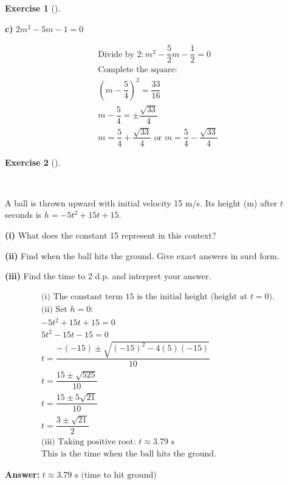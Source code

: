 \documentclass[
  letterpaper,
  DIV=11,
  numbers=noendperiod]{scrreprt}
\theoremstyle{definition}
\newtheorem{exercise}{Exercise}[chapter]
\theoremstyle{remark}
\begin{document}
\begin{exercise}[]
\begin{tcolorbox}
\textbf{c)} \(\displaystyle 2m^2 - 5m - 1 = 0\)

\begin{align*}
\text{Divide by } 2: m^2 -\dfrac{5}{2}m -\dfrac{1}{2} = 0 \\ \text{Complete the square:} \\ \left(m - \dfrac{5}{4}\right)^2 = \dfrac{33}{16} \\ m - \dfrac{5}{4} = \pm \dfrac{\sqrt{33}}{4} \\ m = \dfrac{5}{4} + \dfrac{\sqrt{33}}{4} \text{ or } m = \dfrac{5}{4} - \dfrac{\sqrt{33}}{4}
\end{align*}

\end{tcolorbox}

\end{exercise}

\begin{exercise}[]\protect\hypertarget{exr-u6-20-1}{}\label{exr-u6-20-1}

~

A ball is thrown upward with initial velocity 15 m/s. Its height (m)
after \(t\) seconds is \(h = -5t^2 + 15t + 15\).

\textbf{(i)} What does the constant 15 represent in this context?

\textbf{(ii)} Find when the ball hits the ground. Give exact answers in
surd form.

\textbf{(iii)} Find the time to 2 d.p. and interpret your answer.

\begin{tcolorbox}[enhanced jigsaw, opacitybacktitle=0.6, coltitle=black, arc=.35mm, colframe=quarto-callout-tip-color-frame, colback=white, bottomrule=.15mm, left=2mm, colbacktitle=quarto-callout-tip-color!10!white, titlerule=0mm, opacityback=0, title=\textcolor{quarto-callout-tip-color}{\faLightbulb}\hspace{0.5em}{🔍 View Solution}, leftrule=.75mm, breakable, rightrule=.15mm, bottomtitle=1mm, toptitle=1mm, toprule=.15mm]

\begin{align*}
\text{(i) The constant term 15 is the initial height (height at } t=0\text{).} \\ \text{(ii) Set } h=0: \\ -5t^2 + 15t + 15 = 0 \\ 5t^2 - 15t - 15 = 0 \\ t = \dfrac{-(-15) \pm \sqrt{(-15)^2 - 4(5)(-15)}}{10} \\ t = \dfrac{15 \pm \sqrt{525}}{10} \\ t = \dfrac{15 \pm 5\sqrt{21}}{10} \\ t = \dfrac{3 \pm \sqrt{21}}{2} \\ \text{(iii) Taking positive root: } t \approx 3.79 \text{ s} \\ \text{This is the time when the ball hits the ground.}
\end{align*}

\textbf{Answer:} \(t \approx 3.79 \text{ s (time to hit ground)}\)

\end{tcolorbox}

\end{exercise}
\end{document}
